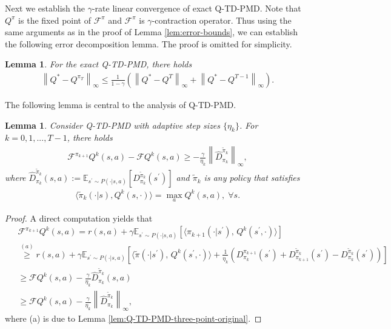\documentclass[10pt]{article}
\newcommand{\calF}{\mathcal{F}}
\newcommand{\ls}{\left}
\newcommand{\rs}{\right}
\theoremstyle{plain}
\newtheorem{lemma}[theorem]{Lemma}
\theoremstyle{definition}
\begin{document}
Next we establish the $\gamma$-rate linear convergence of  exact Q-TD-PMD. Note that $Q^\pi$ is the fixed point of $\calF^\pi$ and $\calF^\pi$ is $\gamma$-contraction operator. Thus using the same arguments as in the proof of Lemma \ref{lem:error-bounds}, we can establish the following error decomposition lemma. The proof is omitted for simplicity. 
\begin{lemma}
    \label{lem:error-bounds-Q}
    For the exact Q-TD-PMD, there holds 
    \begin{align}
        \ls\| Q^{*} - Q^{\pi_T} \rs\|_\infty \leq \frac{1}{1-\gamma} \ls( \ls\| Q^* - Q^T \rs\|_\infty + \ls\| Q^* - Q^{T-1} \rs\|_\infty\rs).
    \end{align}
\end{lemma}
The following lemma is central to the analysis of Q-TD-PMD.
\begin{lemma}
    \label{lem:Q-TD-PMD-three-point-linear}
Consider Q-TD-PMD with adaptive step sizes $\{\eta_k\}$.    For $k=0,1,...,T-1$, there holds
    \begin{align}
\mathcal{F} ^{\pi _{k+1}}Q^k(s,a)-\mathcal{F} Q^k(s,a) \ge - \frac{\gamma}{\eta _k}\left\| \hat{D}_{\pi _k}^{\tilde{\pi}_k} \right\| _{\infty},
        \label{eq:Q-TD-PMD-three-point-linear}
    \end{align}
    where $
\hat{D}_{\pi _k}^{\tilde{\pi}_k}\left( s,a \right) :=\mathbb{E} _{s^{\prime}\sim P\left( \cdot |s,a \right)}\left[ D_{\pi _k}^{\tilde{\pi}_k}\left( s^{\prime} \right) \right] $ and  $\tilde{\pi}_k$ is any policy that satisfies
    \begin{align*}
\langle\tilde{\pi}_k(\cdot|s),Q^k(s,\cdot)\rangle = \max_aQ^{k}(s,a),\;\forall s.
    \end{align*}
\end{lemma}
\begin{proof} A direct computation yields that 
\begin{align*}
&\mathcal{F} ^{\pi _{k+1}}Q^k\left( s,a \right) =r\left( s,a \right) +\gamma \mathbb{E} _{s^{\prime}\sim P\left( \cdot |s,a \right)}\left[ \langle \pi _{k+1}(\cdot |s^{\prime}),\,Q^k(s^\prime,\cdot )\rangle \right] 
\\
\,\,&\overset{\left( a \right)}{\ge}r\left( s,a \right) +\gamma \mathbb{E} _{s^{\prime}\sim P\left( \cdot |s,a \right)}\left[ \langle \tilde{\pi}(\cdot |s^{\prime}),\,Q^k(s^\prime,\cdot )\rangle +\frac{1}{\eta _k}\left( D_{\pi _k}^{\pi _{k+1}}(s^{\prime})+D_{\pi _{k+1}}^{\tilde{\pi}_k}(s^{\prime})-D_{\pi _k}^{\tilde{\pi}_k}(s^{\prime}) \right) \right] 
\\
\,\,&\ge \mathcal{F} Q^k\left( s,a \right) -\frac{\gamma}{\eta _k}\hat{D}_{\pi _k}^{\tilde{\pi}_k}\left( s,a \right) 
\\
\,\,&\ge \mathcal{F} Q^k\left( s,a \right) -\frac{\gamma}{\eta _k}\left\| \hat{D}_{\pi _k}^{\tilde{\pi}_k} \right\| _{\infty},
\end{align*}
where (a) is due to Lemma \ref{lem:Q-TD-PMD-three-point-original}.
\end{proof}
\end{document}
